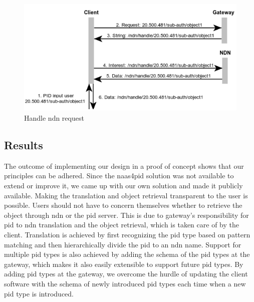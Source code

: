 \begin{figure}[H]
\includegraphics[scale=0.75]{Images/ndn_req.png}
\caption{Handle \gls{ndn} request}
\label{fig:seq_ndn}
\end{figure}


\subsection{Results}\label{results-pid}
The outcome of implementing our design in a proof of concept shows that our principles can be adhered. Since the \gls{naas4pid} solution was not available to extend or improve it, we came up with our own solution and made it publicly available. Making the translation and object retrieval transparent to the user is possible. Users should not have to concern themselves whether to retrieve the object through \gls{ndn} or the \gls{pid} server. This is due to gateway's responsibility for \gls{pid} to \gls{ndn} translation and the object retrieval, which is taken care of by the client. 
Translation is achieved by first recognizing the \gls{pid} type based on pattern matching and then hierarchically divide the \gls{pid} to an \gls{ndn} name. Support for multiple \gls{pid} types is also achieved by adding the schema of the \gls{pid} types at the gateway, which makes it also easily extensible to support future \gls{pid} types. By adding \gls{pid} types at the gateway, we overcome the hurdle of updating the client software with the schema of newly introduced \gls{pid} types each time when a new \gls{pid} type is introduced.




